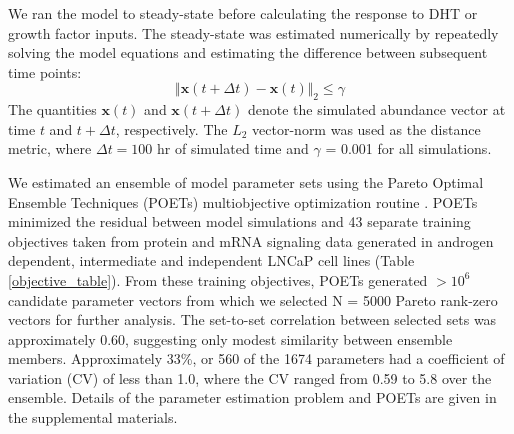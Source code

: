 \documentclass[12pt]{article}
\begin{document}
We ran the model to steady-state before calculating the response to DHT or growth factor inputs.
The steady-state was estimated numerically by repeatedly solving the model equations and estimating the difference between subsequent time points:
\begin{equation}
\Vert\mathbf{x}\left(t+\Delta{t}\right) - \mathbf{x}\left(t\right)\Vert_{2}\leq\gamma
\end{equation}
The quantities $\mathbf{x}\left(t\right)$ and $\mathbf{x}\left(t+\Delta{t}\right)$ denote the simulated abundance vector at time $t$ and $t + \Delta{t}$, respectively.
The $L_{2}$ vector-norm was used as the distance metric, where $\Delta{t} = 100$ hr of simulated time and $\gamma$ = 0.001 for all simulations.

We estimated an ensemble of model parameter sets using the Pareto Optimal Ensemble Techniques (POETs) multiobjective optimization routine \cite{Song:2009dq,Song2010,Lequieu:2011eu}. 
POETs minimized the residual between model simulations and 43 separate training objectives taken from protein and mRNA signaling data generated in androgen dependent, intermediate and independent LNCaP cell lines (Table \ref{objective_table}). 
From these training objectives, POETs generated $>10^6$ candidate parameter vectors from which we selected N = 5000 Pareto rank-zero vectors for further analysis. 
The set-to-set correlation between selected sets was approximately 0.60, suggesting only modest similarity between ensemble members.
Approximately 33\%, or 560 of the 1674 parameters had a coefficient of variation (CV) of less than 1.0, where the CV ranged from 0.59 to 5.8 over the ensemble.
Details of the parameter estimation problem and POETs are given in the supplemental materials. 
\end{document}
